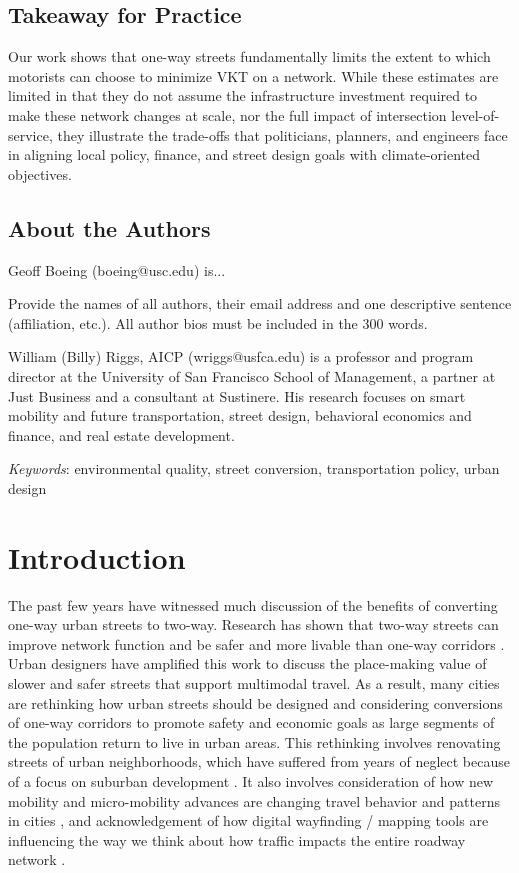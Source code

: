 \documentclass{article}
\begin{document}
\subsection{Takeaway for Practice}
Our work shows that one-way streets fundamentally limits the extent to which motorists can choose to minimize VKT on a network. While these estimates are limited in that they do not assume the infrastructure investment required to make these network changes at scale, nor the full impact of intersection level-of-service, they illustrate the trade-offs that politicians, planners, and engineers face in aligning local policy, finance, and street design goals with climate-oriented objectives.

\subsection{About the Authors}
Geoff Boeing (boeing@usc.edu) is... 

Provide the names of all authors, their email address and one descriptive sentence (affiliation, etc.). All author bios must be included in the 300 words.


William (Billy) Riggs, AICP (wriggs@usfca.edu) is a professor and program director at the University of San Francisco School of Management, a partner at Just Business and a consultant at Sustinere. His research focuses on smart mobility and future transportation, street design, behavioral economics and finance, and real estate development. 


\hfill\break%
\noindent\textit{Keywords}: environmental quality, street conversion, transportation policy, urban design
\newpage
\section{Introduction}

The past few years have witnessed much discussion of the benefits of converting one-way urban streets to two-way. Research has shown that two-way streets can improve network function \citep{gayah_two-way_2012,gayah_analytical_2012} and be safer and more livable than one-way corridors \citep{riggs_two-way_2016}. Urban designers have amplified this work to discuss the place-making value of slower and safer streets that support multimodal travel. As a result, many cities are rethinking how urban streets should be designed and considering conversions of one-way corridors to promote safety and economic goals as large segments of the population return to live in urban areas. This rethinking involves renovating streets of urban neighborhoods, which have suffered from years of neglect because of a focus on suburban development \citep{dover_street_2013,duany_suburban_2001}. It also involves consideration of how new mobility and micro-mobility advances are changing travel behavior and patterns in cities \citep{clewlow_disruptive_2017,clewlow_micro-mobility_2018,riggs_disruptive_2019,shaheen_shared_2018}, and acknowledgement of how digital wayfinding / mapping tools are influencing the way we think about how traffic impacts the entire roadway network \citep{macfarlane_your_2019, littman_waze_2019}.
\end{document}
